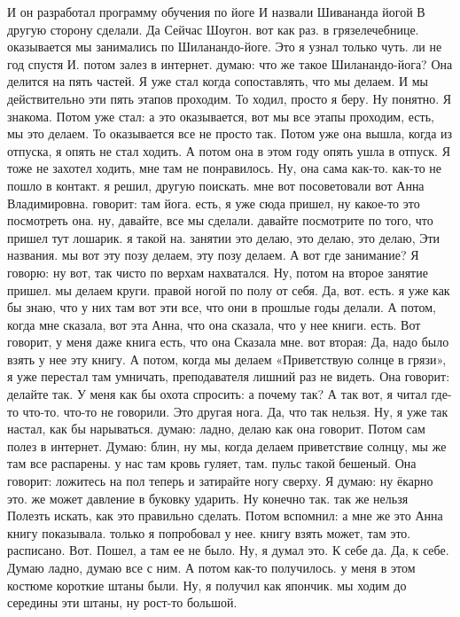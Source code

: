И он разработал программу обучения по йоге И назвали
Шивананда йогой В другую сторону сделали.
Да Сейчас Шоугон.
вот как раз.
в грязелечебнице. оказывается мы занимались по Шиланандо-йоге. Это я узнал только чуть.
ли не год спустя И.
потом залез в интернет. думаю: что же такое Шиланандо-йога?
Она делится на пять частей.
Я уже стал когда сопоставлять, что мы делаем.
И мы действительно эти пять этапов проходим.
То ходил, просто я беру.
Ну понятно.
Я знакома.
Потом уже стал: а это оказывается, вот мы все этапы проходим, есть, мы это делаем.
То оказывается все не просто так.
Потом уже она вышла, когда из отпуска, я опять не стал ходить.
А потом она в этом году опять ушла в отпуск.
Я тоже не захотел ходить, мне там не понравилось.
Ну, она сама как-то.
как-то не пошло в контакт.
я решил, другую поискать. мне вот посоветовали вот Анна Владимировна.
говорит: там йога.
есть, я уже сюда пришел, ну какое-то это посмотреть она. ну, давайте, все мы сделали. давайте посмотрите по того, что пришел тут лошарик.
я такой на.
занятии это делаю, это делаю, это делаю, Эти названия. мы вот эту позу делаем, эту позу делаем. А вот где занимание? Я говорю: ну вот, так чисто по верхам нахватался. Ну, потом на второе занятие пришел.
мы делаем круги.
правой ногой по полу от себя. Да, вот.
есть. я уже как бы знаю, что у них там вот эти все, что они в прошлые годы делали. А потом, когда мне сказала, вот эта Анна, что она сказала,
что у нее книги.
есть.
Вот говорит, у меня даже книга есть, что она Сказала мне. вот вторая:
Да, надо было взять у нее эту книгу.
А потом, когда мы делаем «Приветствую солнце в грязи», я уже перестал там умничать, преподавателя лишний раз не видеть.
Она говорит: делайте так.
У меня как бы охота спросить: а почему так?
А так вот, я читал где-то что-то.
что-то не говорили. Это другая нога.
Да, что так нельзя. Ну, я уже так настал, как бы нарываться. думаю: ладно, делаю как она говорит. Потом сам полез в интернет. Думаю: блин, ну мы, когда делаем приветствие солнцу, мы же там все распарены.
у нас там кровь гуляет, там.
пульс такой бешеный. Она говорит: ложитесь на пол теперь и затирайте ногу сверху.
Я думаю: ну ёкарно это.
же может давление в буковку ударить. Ну конечно так. так же нельзя Полезть искать, как это правильно сделать. Потом вспомнил:
а мне же это Анна книгу показывала.
только я попробовал у нее.
книгу взять может, там это.
расписано.
Вот.
Пошел, а там ее не было.
Ну, я думал это.
К себе да.
Да, к себе.
Думаю ладно, думаю все с ним.
А потом как-то получилось. у меня в этом костюме короткие штаны были.
Ну, я получил как япончик. мы ходим до середины эти штаны, ну рост-то большой.
